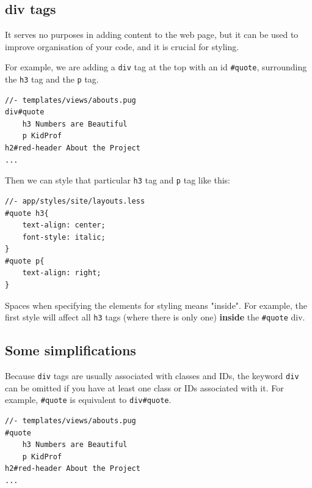 \subsection{div tags}

It serves no purposes in adding content to the web page, but it can be used to improve organisation of your code, and it is crucial for styling. 

For example, we are adding a \texttt{div} tag at the top with an id \texttt{\#quote}, surrounding the \texttt{h3} tag and the \texttt{p} tag.
\vspace{6mm}

\begin{lstlisting}[language=pug]
//- templates/views/abouts.pug
div#quote
    h3 Numbers are Beautiful
    p KidProf
h2#red-header About the Project
...
\end{lstlisting}
\vspace{6mm}

Then we can style that particular \texttt{h3} tag and \texttt{p} tag like this:
\vspace{6mm}

\begin{lstlisting}[language=pug]
//- app/styles/site/layouts.less
#quote h3{
    text-align: center;
    font-style: italic;
}
#quote p{
    text-align: right;
}
\end{lstlisting}
\vspace{6mm}

Spaces when specifying the elements for styling means "inside". For example, the first style will affect all \texttt{h3} tags (where there is only one) \textbf{inside} the \texttt{\#quote} div.

\subsection*{Some simplifications}
Because \texttt{div} tags are usually associated with classes and IDs, the keyword \texttt{div} can be omitted if you have at least one class or IDs associated with it. For example, \texttt{\#quote} is equivalent to \texttt{div\#quote}.
\vspace{6mm}

\begin{lstlisting}[language=pug]
//- templates/views/abouts.pug
#quote
    h3 Numbers are Beautiful
    p KidProf
h2#red-header About the Project
...
\end{lstlisting}
\vspace{6mm}

